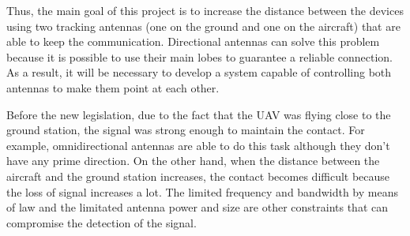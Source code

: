 Thus, the main goal of this project is to increase the distance between the devices using two tracking antennas (one on the ground and one on the aircraft) that are able to keep the communication. Directional antennas can solve this problem  because it is possible to use their main lobes to guarantee a reliable connection. As a result, it will be necessary to develop a system capable of controlling both antennas to make them point at each other.



Before the new legislation, due to the fact that the UAV was flying close to the ground station, the signal was strong enough to maintain the contact. For example, omnidirectional antennas are able to do this task although they don't have any prime direction. On the other hand, when the distance between the aircraft and the ground station increases, the contact becomes difficult because the loss of signal increases a lot. The limited frequency and bandwidth by means of law and the limitated antenna power and size are other constraints that can compromise the detection of the signal. 


